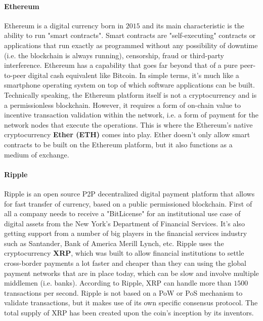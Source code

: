 \paragraph{Ethereum} Ethereum is a digital currency born in $2015$ and its main characteristic is the ability to run "smart contracts". Smart contracts are "self-executing" contracts or applications that run exactly as programmed without any possibility of downtime (i.e. the blockchain is always running), censorship, fraud or third-party interference. Ethereum has a capability that goes far beyond that of a pure peer-to-peer digital cash equivalent like Bitcoin. In simple terms, it's much like a smartphone operating system on top of which software applications can be built. Technically speaking, the Ethereum platform itself is not a cryptocurrency and is a permissionless blockchain. However, it requires a form of on-chain value to incentive transaction validation within the network, i.e. a form of payment for the network nodes that execute the operations. This is where the Ethereum's native cryptocurrency \textbf{Ether (ETH)} comes into play. Ether doesn't only allow smart contracts to be built on the Ethereum platform, but it also functions as a medium of exchange.


\paragraph{Ripple} Ripple is an open source P2P decentralized digital payment platform that allows for fast transfer of currency, based on a public permissioned blockchain. First of all a company needs to receive a "BitLicense" for an institutional use case of digital assets from the New York's Department of Financial Services. It's also getting support from a number of big players in the financial services industry such as Santander, Bank of America Merill Lynch, etc. Ripple uses the cryptocurrency \textbf{XRP}, which was built to allow financial institutions to settle cross-border payments a lot faster and cheaper than they can using the global payment networks that are in place today, which can be slow and involve multiple middlemen (i.e. banks). According to Ripple, XRP can handle more than $1500$ transactions per second. Ripple is not based on a PoW or PoS mechanism to validate transactions, but it makes use of its own specific consensus protocol. The total supply of XRP has been created upon the coin's inception by its inventors.

